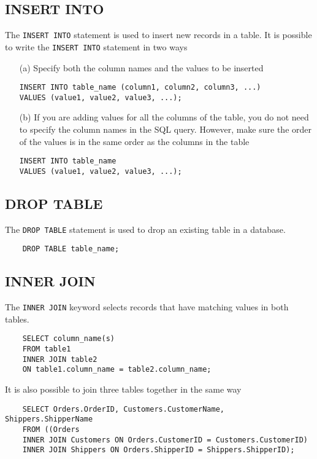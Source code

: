 \documentclass{thomasClass}
\begin{document}
\subsection{INSERT INTO}
The \verb|INSERT INTO| statement is used to insert new records in a table.
It is possible to write the \verb|INSERT INTO| statement in two ways
\begin{enumerate}
\item[(a)] Specify both the column names and the values to be inserted
\begin{verbatim}
INSERT INTO table_name (column1, column2, column3, ...)
VALUES (value1, value2, value3, ...);
\end{verbatim}
\item[(b)] If you are adding values for all the columns of the table, you do not need to specify the column names in the SQL query. However, make sure the order of the values is in the same order as the columns in the table
\begin{verbatim}
INSERT INTO table_name
VALUES (value1, value2, value3, ...);
\end{verbatim}
\end{enumerate}

\subsection{DROP TABLE}
The \verb|DROP TABLE| statement is used to drop an existing table in a database.
\begin{verbatim}
    DROP TABLE table_name;
\end{verbatim}

\subsection{INNER JOIN}
The \verb|INNER JOIN| keyword selects records that have matching values in both tables.
\begin{verbatim}
    SELECT column_name(s)
    FROM table1
    INNER JOIN table2
    ON table1.column_name = table2.column_name;
\end{verbatim}
It is also possible to join three tables together in the same way
\begin{verbatim}
    SELECT Orders.OrderID, Customers.CustomerName, Shippers.ShipperName
    FROM ((Orders
    INNER JOIN Customers ON Orders.CustomerID = Customers.CustomerID)
    INNER JOIN Shippers ON Orders.ShipperID = Shippers.ShipperID);
\end{verbatim}
\end{document}
